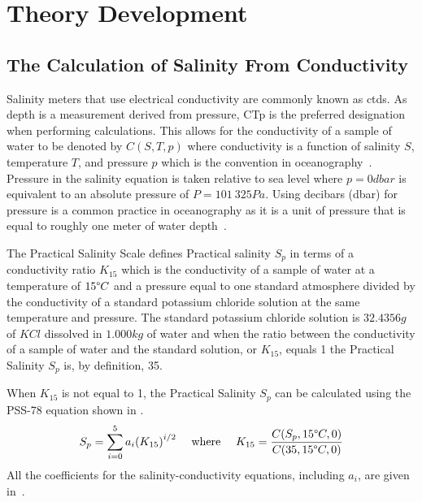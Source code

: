 
\chapter{Theory Development}\label{ch:theory-development}

\section{The Calculation of Salinity From Conductivity}\label{sec:salinity-conductivity-relationship}

Salinity meters that use electrical conductivity are commonly known as \glspl{ctd}.
As depth is a measurement derived from pressure, CTp is the preferred designation when performing calculations.
This allows for the conductivity of a sample of water to be denoted by $C(S, T, p)$ where conductivity is a function of salinity $S$, temperature $T$, and pressure $p$ which is the convention in oceanography~\cite{lewis_salinity_definition_and_calculation_1978}.
Pressure in the salinity equation is taken relative to sea level where $p = 0 dbar$ is equivalent to an absolute pressure of $P = 101\ 325 Pa$.
Using decibars (dbar) for pressure is a common practice in oceanography as it is a unit of pressure that is equal to roughly one meter of water depth~\cite{seabird_dbar_to_depth_2024}.

The Practical Salinity Scale defines Practical salinity $S_p$ in terms of a conductivity ratio $K_{15}$ which is the conductivity of a sample of water at a temperature of $15\degree C$ and a pressure equal to one standard atmosphere divided by the conductivity of a standard potassium chloride solution at the same temperature and pressure.
The standard potassium chloride solution is $32.4356g$ of $KCl$ dissolved in $1.000kg$ of water and when the ratio between the conductivity of a sample of water and the standard solution, or $K_{15}$, equals 1 the Practical Salinity $S_p$ is, by definition, 35.

When $K_{15}$ is not equal to 1, the Practical Salinity $S_p$ can be calculated using the PSS-78 equation shown in .
\begin{equation}\label{eq:pss-78-k15}
    S_p = \sum_{i=0}^{5} a_i {(K_{15})}^{i/2}~~~~\text{where}~~~~K_{15} = \frac{C(S_p, 15\degree C, 0)}{C(35, 15\degree C, 0)}
\end{equation}
All the coefficients for the salinity-conductivity equations, including $a_i$, are given in~.

